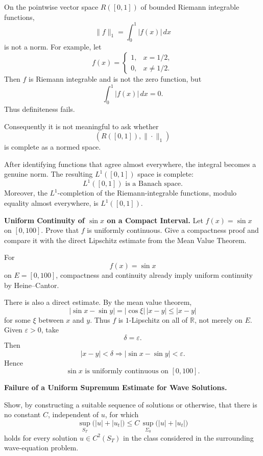 \begin{solution}
On the pointwise vector space \(R([0,1])\) of bounded Riemann integrable functions,
\[
\|f\|_1=\int_0^1|f(x)|\,dx
\]
is not a norm. For example, let
\[
f(x)=
\begin{cases}
1,&x=1/2,\\
0,&x\neq1/2.
\end{cases}
\]
Then \(f\) is Riemann integrable and is not the zero function, but
\[
\int_0^1|f(x)|\,dx=0.
\]
Thus definiteness fails.

Consequently it is not meaningful to ask whether
\[
(R([0,1]),\|\cdot\|_1)
\]
is complete as a normed space.

After identifying functions that agree almost everywhere, the integral becomes a genuine
norm. The resulting \(L^1([0,1])\) space is complete:
\[
\boxed{L^1([0,1])\text{ is a Banach space}.}
\]
Moreover, the \(L^1\)-completion of the Riemann-integrable functions, modulo equality almost
everywhere, is \(L^1([0,1])\).
\end{solution}


\begin{problem}[CP-II-0443]
\label{prob:cp-ii-0443}
\textbf{Uniform Continuity of \(\sin x\) on a Compact Interval.}
Let \(f(x)=\sin x\) on \([0,100]\). Prove that \(f\) is uniformly continuous. Give a compactness proof and compare it with the direct Lipschitz estimate from the Mean Value Theorem.
\end{problem}

\begin{solution}
For
\[
f(x)=\sin x
\]
on \(E=[0,100]\), compactness and continuity already imply uniform continuity by
Heine--Cantor.

There is also a direct estimate. By the mean value theorem,
\[
|\sin x-\sin y|
=
|\cos \xi|\,|x-y|
\le
|x-y|
\]
for some \(\xi\) between \(x\) and \(y\). Thus \(f\) is \(1\)-Lipschitz on all of
\(\mathbb R\), not merely on \(E\). Given \(\varepsilon>0\), take
\[
\delta=\varepsilon.
\]
Then
\[
|x-y|<\delta
\Longrightarrow
|\sin x-\sin y|<\varepsilon.
\]
Hence
\[
\boxed{\sin x\text{ is uniformly continuous on }[0,100].}
\]
\end{solution}


\begin{problem}[CP-II-0445]
\label{prob:cp-ii-0445}
\textbf{Failure of a Uniform Supremum Estimate for Wave Solutions.}

\hspace*{1.5em}Show, by constructing a suitable sequence of solutions or otherwise, that there
is no constant \(C\), independent of \(u\), for which
\[
\sup_{S_T}\bigl(|u|+|u_t|\bigr)
\le
C\,
\sup_{\Sigma_0}\bigl(|u|+|u_t|\bigr)
\]
holds for every solution \(u\in C^2(S_T)\) in the class considered in the
surrounding wave-equation problem.
\end{problem}

